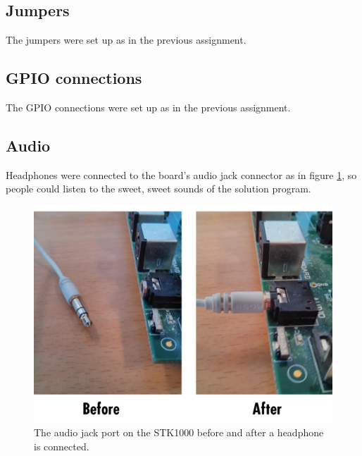 \subsection{Jumpers}

The jumpers were set up as in the previous assignment\cite{tdt4258-1}.

\subsection{GPIO connections}

The GPIO connections were set up as in the previous assignment\cite{tdt4258-1}.

\subsection{Audio}

Headphones were connected to the board's audio jack connector as in figure \ref{img-audiojack}, so people could listen to the sweet, sweet sounds of the solution program.

\begin{figure}[H]
	\includegraphics[width = \textwidth]{images/audiojack.png}
	\caption{The audio jack port on the STK1000 before and after a headphone is connected.}
	\label{img-audiojack}
\end{figure}
